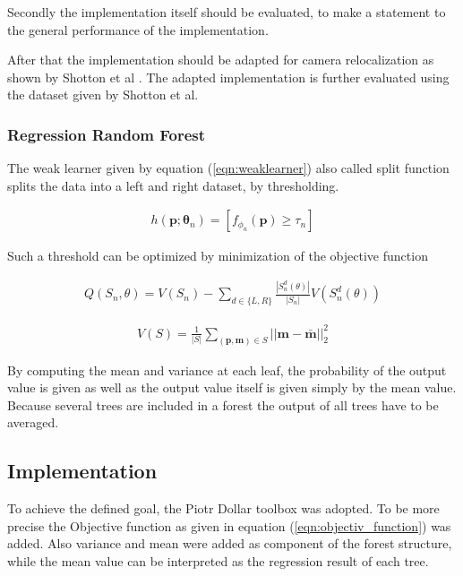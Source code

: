Secondly the implementation itself should be evaluated, to make a statement to the general performance of the implementation.

After that the implementation should be adapted for camera relocalization as shown by Shotton et al \cite{shotton}. The adapted implementation is further evaluated using the dataset given by Shotton et al.

\subsubsection{Regression Random Forest}
\label{rrf_intro}
The weak learner given by equation (\ref{eqn:weaklearner}) also called split function splits the data into a left and right dataset, by thresholding.

\begin{eqnarray}\label{eqn:weaklearner}
  h(\mathbf{p};\mathbf{\theta}_n) = [ f_{\phi_n}(\mathbf{p}) \geq \tau_n ]
\end{eqnarray}

Such a threshold can be optimized by minimization of the objective function

\begin{eqnarray} \label{eqn:objectiv_function}
  Q(S_n,\theta) = V(S_n) - \sum_{d\in\{L,R\}}{\frac{|S_n^d(\theta)|}{|S_n|}V(S_n^d(\theta))}
\end{eqnarray}

\begin{eqnarray}
  V(S) = \frac{1}{|S|} \sum_{(\mathbf{p},\mathbf{m}) \in S}{||\mathbf{m} - \mathbf{\bar m}||_2^2}
\end{eqnarray}

By computing the mean and variance at each leaf, the probability of the output value is given as well as the output value itself is given simply by the mean value.
Because several trees are included in a forest the output of all trees have to be averaged.

\subsection{Implementation} %
\label{sub:implementation}
To achieve the defined goal, the Piotr Dollar toolbox \cite{piotr} was adopted. To be more precise the Objective function as given in equation (\ref{eqn:objectiv_function}) was added. Also variance and mean were added as component of the forest structure, while the mean value can be interpreted as the regression result of each tree.

